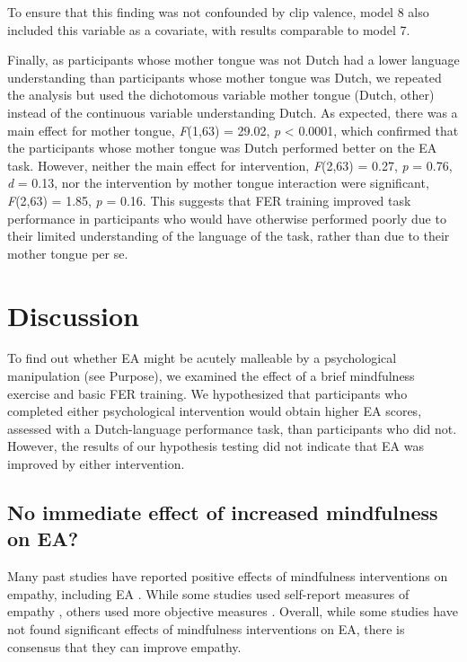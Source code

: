 \documentclass[authordate, empirical, issue]{jote-new-article}
\begin{document}
To ensure that this finding was not confounded by clip valence, model 8 also included this variable as a covariate, with results comparable to model 7.



Finally, as participants whose mother tongue was not Dutch had a lower language understanding than participants whose mother tongue was Dutch, we repeated the analysis but used the dichotomous variable mother tongue (Dutch, other) instead of the continuous variable understanding Dutch. As expected, there was a main effect for mother tongue, \emph{F}(1,63) = 29.02, \emph{p} < 0.0001, which confirmed that the participants whose mother tongue was Dutch performed better on the EA task. However, neither the main effect for intervention, \emph{F}(2,63) = 0.27, \emph{p} = 0.76, \emph{d} = 0.13, nor the intervention by mother tongue interaction were significant, \emph{F}(2,63) = 1.85, \emph{p} = 0.16. This suggests that FER training improved task performance in participants who would have otherwise performed poorly due to their limited understanding of the language of the task, rather than due to their mother tongue per se.



\section{Discussion}



To find out whether EA might be acutely malleable by a psychological manipulation (see Purpose), we examined the effect of a brief mindfulness exercise and basic FER training. We hypothesized that participants who completed either psychological intervention would obtain higher EA scores, assessed with a Dutch-language performance task, than participants who did not. However, the results of our hypothesis testing did not indicate that EA was improved by either intervention.



\subsection{No immediate effect of increased mindfulness on EA?}



Many past studies have reported positive effects of mindfulness interventions on empathy, including EA \parencites[e.g.,][]{Lam2011}. While some studies used self-report measures of empathy \parencites{Birnie2010}{Shapiro1998}, others used more objective measures \parencites[e.g.,][]{Mascaro2013}. Overall, while some studies have not found significant effects of mindfulness interventions on EA, there is consensus that they can improve empathy.
\end{document}
